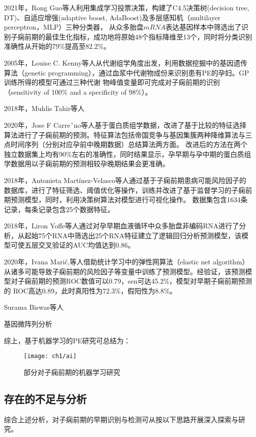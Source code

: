 2021年，Rong Guo等人\cite{Guo2021}利用集成学习投票决策，构建了C4.5决策树(decision tree, DT)、自适应增强(adaptive boost, AdaBoost)及多层感知机（multilayer perceptron，MLP）三种分类器，
从众多胎盘$mRNA$表达基因样本中筛选出了识别子痫前期的最佳生化指标，成功地将原始48个指标降维至13个，同时将分类识别准确性从开始的$79\%$提高至$82.2\%$。

2005年，Louise C. Kenny等人\cite{Kenny2005}从代谢组学角度出发，利用数据挖掘中的基因遗传算法（genetic programming），通过血浆中代谢物成份来识别患有PE的孕妇。GP训练所得的模型可通过三种代谢
物峰值变量即可完成对子痫前期的识别（sensitivity of 100\% and a specificity of 98\%）。

2018年，Muhlis Tahir\cite{Tahir2018}等人

2020年，Jose F Carre˜no等人\cite{Carreno2020}基于蛋白质组学数据，改进了基于比较的特征选择算法进行了子痫前期的预测。特征算法包括帝国竞争与基因集簇两种降维算法与三点时间序列（分别对应孕前中晚期数据）总结算法两方面。
改进后的方法在两个独立数据集上均有90\%左右的准确性，同时结果显示，孕早期与孕中期的蛋白质组学数据用以子痫前期的预测相较孕晚期结果会更准确。

2018年，Antonieta Martínez-Velasco等人\cite{Martinez2018}通过基于子痫前期患病可能风险因子的数据库，进行了特征筛选、阈值优化等操作，训练并改进了基于监督学习的子痫前期预测模型，同时，利用决策树算法对模型进行可视化操作。
数据集包含1634条记录，每条记录包含25个数据特征。

2018年，Liron Yoffe等人\cite{Yoffe2018}通过对孕早期血液循环中众多胎盘非编码RNA进行了分析，从起始75个RNA中筛选出25个RNA特征建立了逻辑回归分析预测模型，该模型可使五层交叉验证的AUC均值达到0.86。

2020年，Ivana Mari{\'{c}}\cite{Maric2020},等人借助统计学习中的弹性网算法（elastic net algorithm）从诸多可能导致子痫前期的风险因子等变量中训练了预测模型。经验证，该预测模型对子痫前期的预测ROC数值可以0.79，sen可达45.2\%，模型对早期子痫前期预测的
ROC高达0.89，此时真阳性为72.3\%，假阳性为8.8\%。

Surama Biswas等人

基因微阵列分析


综上，基于机器学习的PE研究可总结为：


\begin{figure}[htbp]
    \centering
    \texttt{[image: ch1/ai]}
    \caption{\label{fig:ai}部分对子痫前期的机器学习研究}
\end{figure}

\subsection{存在的不足与分析}
综合上述分析，对子痫前期的早期识别与检测可从按以下思路开展深入探索与研究。


